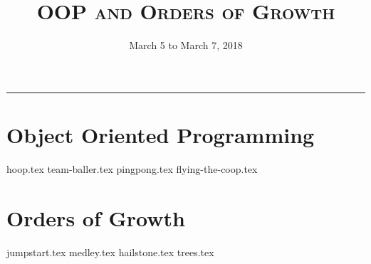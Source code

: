 \documentclass{exam}
\title{\textsc{OOP and Orders of Growth}}
\date{March 5 to March 7, 2018}
\begin{document}
\maketitle
\rule{\textwidth}{0.15em}
\fontsize{12}{15}\selectfont

\section{Object Oriented Programming}
\begin{questions}
{hoop.tex}
{team-baller.tex}
{pingpong.tex}
{flying-the-coop.tex}
\end{questions}

\newpage
\section{Orders of Growth}
\begin{questions}
{jumpstart.tex}
{medley.tex}
{hailstone.tex}
{trees.tex}
\end{questions}
\end{document}
